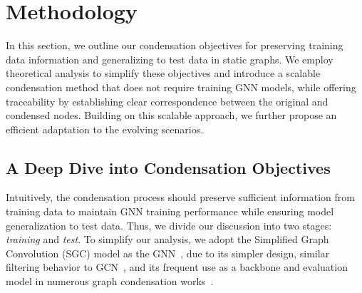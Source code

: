 \section{Methodology} 


In this section, we outline our condensation objectives for preserving training data information and generalizing to test data in static graphs. We employ theoretical analysis to simplify these objectives and introduce a scalable condensation method that does not require training GNN models, while offering traceability by establishing clear correspondence between the original and condensed nodes. Building on this scalable approach, we further propose an efficient adaptation to the evolving scenarios.



\subsection{A Deep Dive into Condensation Objectives}
Intuitively, the condensation process should preserve sufficient information from training data to maintain GNN training performance while ensuring model generalization to test data. Thus, we divide our discussion into two stages:  \textit{training} and \textit{test}.  To simplify our analysis, we adopt the {Simplified Graph Convolution} (SGC) model as the GNN~\cite{wu2019simplifying}, due to its simpler design, similar filtering behavior to GCN~\cite{kipf2016semi}, and its frequent use as a backbone and evaluation model in numerous graph condensation works~\cite{jin2021graph, jin2022condensing,gong2024gc4nc, xiao2024simple}.


